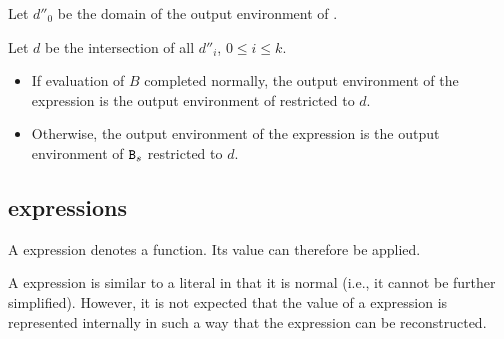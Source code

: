 Let $d''_0$ be the domain of the output environment of .

Let $d$ be the intersection of all $d''_i$, $0\leq i\leq k$.

\begin{itemize}
\item If evaluation of $B$ completed normally, the output environment of
the  expression is the output environment of  restricted
to $d$.
\item Otherwise, the output environment of
the  expression is the output environment of ${\tt{\sl B}}_s$ restricted
to $d$.
\end{itemize}
\fi

\subsection{ expressions}

\label{section:fun-exprs}

A  expression denotes a function.  Its value can therefore be applied.

A  expression is similar to a literal in that it is normal (i.e.,
it cannot be further simplified).  However, it is not expected that the value
of a  expression
is represented internally in such a way that the  expression can be
reconstructed.

\SYNTAX

\begin{rules}
       {  \OR
          }

       { \OR
         \TXT{;} }

       {\TXT{(}  \TXT{)}  }
\end{rules}

\EVALUATION

